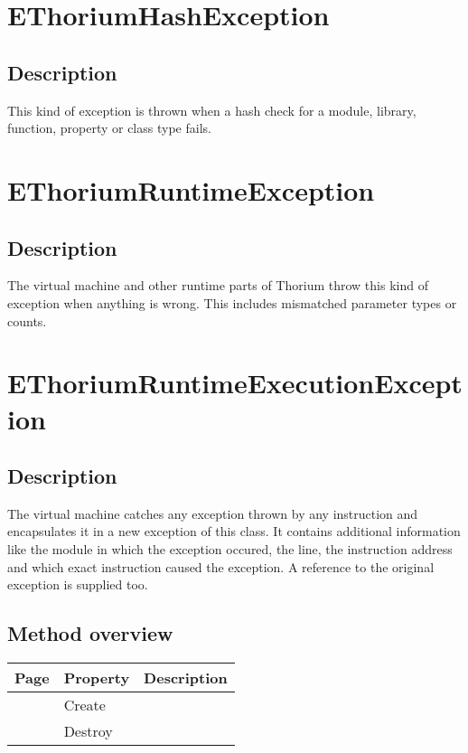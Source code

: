 \section{EThoriumHashException}
\label{thoriumcorepkg:thorium:ethoriumhashexception}
\subsection{Description}
This kind of exception is thrown when a hash check for a module, library, function, property or class type fails.%
\section{EThoriumRuntimeException}
\label{thoriumcorepkg:thorium:ethoriumruntimeexception}
\subsection{Description}
The virtual machine and other runtime parts of Thorium throw this kind of exception when anything is wrong. This includes mismatched parameter types or counts.%
\section{EThoriumRuntimeExecutionException}
\label{thoriumcorepkg:thorium:ethoriumruntimeexecutionexception}
\subsection{Description}
The virtual machine catches any exception thrown by any instruction and encapsulates it in a new exception of this class. It contains additional information like the module in which the exception occured, the line, the instruction address and which exact instruction caused the exception. A reference to the original exception is supplied too.%
\subsection{Method overview}
\label{thoriumcorepkg:thorium:ethoriumruntimeexecutionexception:methods}
\begin{tabularx}{\textwidth}{llX}
Page & Property & Description  \\ \hline
\pageref{thoriumcorepkg:thorium:ethoriumruntimeexecutionexception:create} & Create  &  \\
\pageref{thoriumcorepkg:thorium:ethoriumruntimeexecutionexception:destroy} & Destroy  &  \\
\hline
\end{tabularx}
